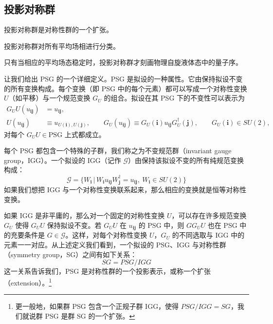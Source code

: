 \subsection{投影对称群}

\begin{keypoints}
\item 投影对称群是对称性群的一个扩张。
\item 投影对称群对所有平均场相进行分类。
\item 只有当相应的平均场态稳定时，投影对称群才刻画物理自旋液体态中的量子序。
\end{keypoints}

让我们给出 PSG 的一个详细定义。PSG 是拟设的一种属性。它由保持拟设不变的所有变换构成。每个变换（即 PSG 中的每个元素）都可以写成一个对称性变换 $U$（如平移）与一个规范变换 $G_U$ 的组合。拟设在其 PSG 下的不变性可以表示为
\begin{align*}
G_U U(u_{\pmb{i}\pmb{j}}) &= u_{\pmb{i}\pmb{j}},\tag{9.4.1}\\
U(u_{\pmb{i}\pmb{j}}) &\equiv u_{U(\pmb{i}),U(\pmb{j})},\qquad G_U(u_{\pmb{i}\pmb{j}})\equiv G_U(\pmb{i})u_{\pmb{i}\pmb{j}}G_U^{\dagger}(\pmb{j}),\qquad G_U(\pmb{i})\in SU(2),
\end{align*}
对每个 $G_UU\in\text{PSG}$ 上式都成立。

每个 PSG 都包含一个特殊的子群，我们称之为不变规范群（invariant gauge group，IGG）。一个拟设的 IGG（记作 $\mathcal{G}$）由保持该拟设不变的所有纯规范变换构成：
\begin{equation*}
\mathcal{G}=\{W_{\pmb{i}}\,|\,W_{\pmb{i}}u_{\pmb{i}\pmb{j}}W_{\pmb{j}}^{\dagger}=u_{\pmb{i}\pmb{j}},\ W_{\pmb{i}}\in SU(2)\}
\tag{9.4.2}
\end{equation*}
如果我们想把 IGG 与一个对称性变换联系起来，那么相应的变换就是恒等对称性变换。

如果 IGG 是非平庸的，那么对一个固定的对称性变换 $U$，可以存在许多规范变换 $G_U$ 使得 $G_UU$ 保持拟设不变。若 $G_UU$ 在 $u_{\pmb{i}\pmb{j}}$ 的 PSG 中，则 $GG_UU$ 也在 PSG 中的充要条件是 $G\in\mathcal{G}$。这样，对每个对称性变换 $U$，$G_U$ 的不同选取与 IGG 中的元素一一对应。从上述定义我们看到，一个拟设的 PSG、IGG 与对称性群（symmetry group，SG）之间有如下关系：
\begin{equation*}
SG=PSG/IGG
\end{equation*}
这一关系告诉我们，PSG 是对称性群的一个投影表示，或称一个扩张（extension）。\footnote{更一般地，如果群 PSG 包含一个正规子群 IGG，使得 $PSG/IGG=SG$，我们就说群 PSG 是群 SG 的一个扩张。}

